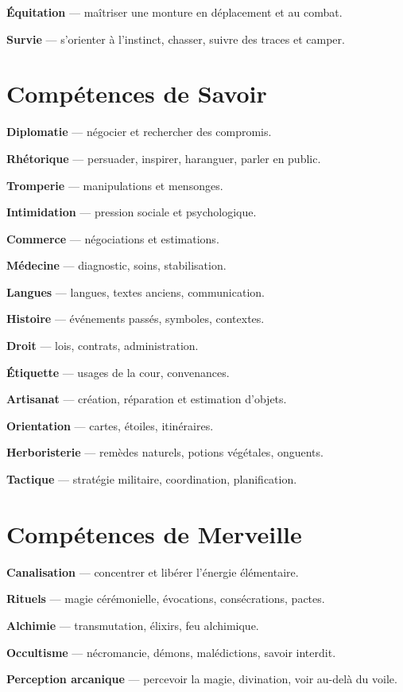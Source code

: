 \documentclass[10pt,a4paper]{article}
\begin{document}
\textbf{Équitation} — maîtriser une monture en déplacement et au combat.

\textbf{Survie} — s'orienter à l'instinct, chasser, suivre des traces et camper.

\section*{Compétences de Savoir}
\textbf{Diplomatie} — négocier et rechercher des compromis.

\textbf{Rhétorique} — persuader, inspirer, haranguer, parler en public.

\textbf{Tromperie} — manipulations et mensonges.

\textbf{Intimidation} — pression sociale et psychologique.

\textbf{Commerce} — négociations et estimations.

\textbf{Médecine} — diagnostic, soins, stabilisation.

\textbf{Langues} — langues, textes anciens, communication.

\textbf{Histoire} — événements passés, symboles, contextes.

\textbf{Droit} — lois, contrats, administration.

\textbf{Étiquette} — usages de la cour, convenances.

\textbf{Artisanat} — création, réparation et estimation d'objets.

\textbf{Orientation} — cartes, étoiles, itinéraires.

\textbf{Herboristerie} — remèdes naturels, potions végétales, onguents.

\textbf{Tactique} — stratégie militaire, coordination, planification.

\section*{Compétences de Merveille}
\textbf{Canalisation} — concentrer et libérer l'énergie élémentaire.

\textbf{Rituels} — magie cérémonielle, évocations, consécrations, pactes.

\textbf{Alchimie} — transmutation, élixirs, feu alchimique.

\textbf{Occultisme} — nécromancie, démons, malédictions, savoir interdit.

\textbf{Perception arcanique} — percevoir la magie, divination, voir au-delà du voile.
\end{document}
